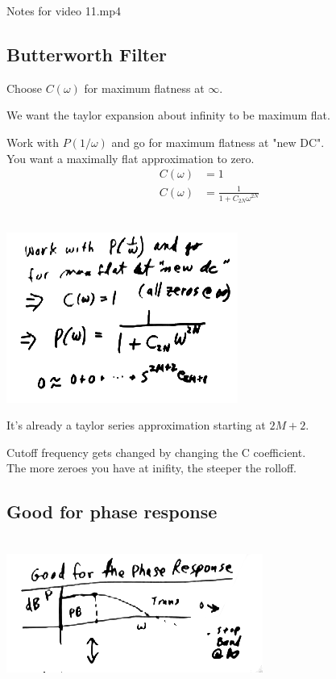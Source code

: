 Notes for video 11.mp4
\subsection*{Butterworth Filter}

Choose $C(\omega)$ for maximum flatness at $\infty$.

We want the taylor expansion about infinity to be maximum flat. 

Work with $P(1/\omega)$ and go for maximum flatness at "new DC". \\
You want a maximally flat approximation to zero. 
\begin{align*}
C(\omega) &= 1 \\
C(\omega) &= \frac{1}{1 + C_{2N}\omega^{2N}}
\end{align*}

\\
\includegraphics[scale=0.5]{frames/15a}


It's already a taylor series approximation starting at $2M + 2$.

Cutoff frequency gets changed by changing the C coefficient. \\

The more zeroes you have at inifity, the steeper the rolloff.  \\

\subsection*{Good for phase response}


\\
\includegraphics[scale=0.5]{frames/15b}


